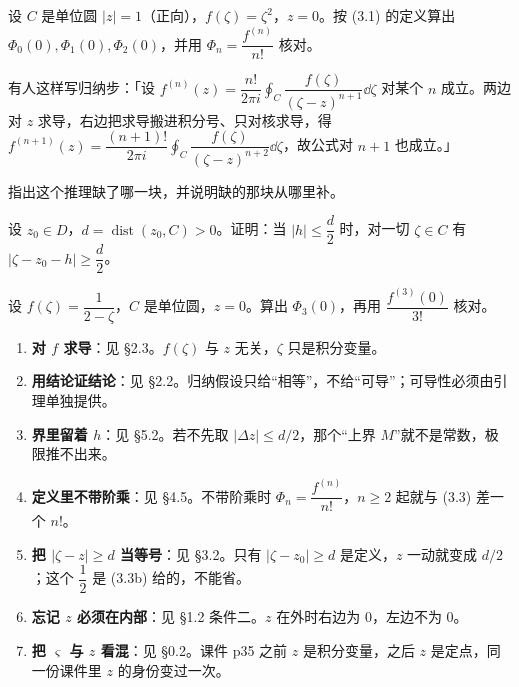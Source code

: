 \documentclass[11pt]{ctexart}
\let\origsubhdr\subhdr
\renewcommand{\subhdr}[1]{\par\origsubhdr{#1}}
\begin{document}
\label{q:1}

设 $C$ 是单位圆 $|z|=1$（正向），$f(\zeta)=\zeta^{2}$，$z=0$。按 (3.1) 的定义算出 $\Phi_0(0),\Phi_1(0),\Phi_2(0)$，并用 $\Phi_n=\dfrac{f^{(n)}}{n!}$ 核对。

\label{q:2}

有人这样写归纳步：「设 $f^{(n)}(z)=\dfrac{n!}{2\pi i}\displaystyle\oint_C\dfrac{f(\zeta)}{(\zeta-z)^{n+1}}\dd\zeta$ 对某个 $n$ 成立。两边对 $z$ 求导，右边把求导搬进积分号、只对核求导，得 $f^{(n+1)}(z)=\dfrac{(n+1)!}{2\pi i}\displaystyle\oint_C\dfrac{f(\zeta)}{(\zeta-z)^{n+2}}\dd\zeta$，故公式对 $n+1$ 也成立。」

指出这个推理缺了哪一块，并说明缺的那块从哪里补。

\label{q:3}

设 $z_0\in D$，$d=\operatorname{dist}(z_0,C)>0$。证明：当 $|h|\le\dfrac{d}{2}$ 时，对一切 $\zeta\in C$ 有 $|\zeta-z_0-h|\ge\dfrac{d}{2}$。

\label{q:4}

设 $f(\zeta)=\dfrac{1}{2-\zeta}$，$C$ 是单位圆，$z=0$。算出 $\Phi_3(0)$，再用 $\dfrac{f^{(3)}(0)}{3!}$ 核对。


\begin{enumerate}[leftmargin=1.9em,label=\textbf{\arabic*}]
\item \textbf{对 $f$ 求导}：见 §2.3。$f(\zeta)$ 与 $z$ 无关，$\zeta$ 只是积分变量。
\item \textbf{用结论证结论}：见 §2.2。归纳假设只给“相等”，不给“可导”；可导性必须由引理单独提供。
\item \textbf{界里留着 $h$}：见 §5.2。若不先取 $|\Delta z|\le d/2$，那个“上界 $M$”就不是常数，极限推不出来。
\item \textbf{定义里不带阶乘}：见 §4.5。不带阶乘时 $\Phi_n=\dfrac{f^{(n)}}{n!}$，$n\ge2$ 起就与 (3.3) 差一个 $n!$。
\item \textbf{把 $|\zeta-z|\ge d$ 当等号}：见 §3.2。只有 $|\zeta-z_0|\ge d$ 是定义，$z$ 一动就变成 $d/2$；这个 $\dfrac12$ 是 (3.3b) 给的，不能省。
\item \textbf{忘记 $z$ 必须在内部}：见 §1.2 条件二。$z$ 在外时右边为 $0$，左边不为 $0$。
\item \textbf{把 $\varsigma$ 与 $z$ 看混}：见 §0.2。课件 p35 之前 $z$ 是积分变量，之后 $z$ 是定点，同一份课件里 $z$ 的身份变过一次。
\end{enumerate}
\end{document}
